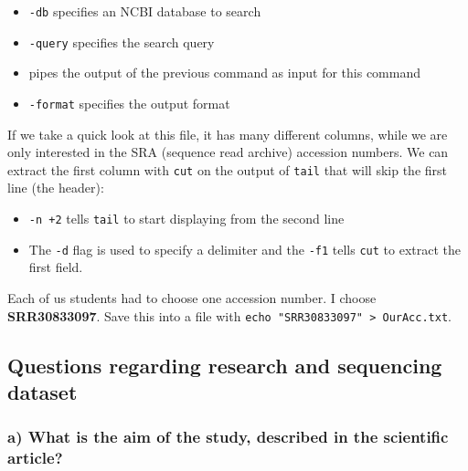 \begin{itemize}
\tightlist
\item
  \texttt{-db} specifies an NCBI database to search
\item
  \texttt{-query} specifies the search query
\item
  \texttt{\textbar{}} pipes the output of the previous command as input
  for this command
\item
  \texttt{-format} specifies the output format
\end{itemize}

If we take a quick look at this file, it has many different columns,
while we are only interested in the SRA (sequence read archive)
accession numbers. We can extract the first column with \texttt{cut} on
the output of \texttt{tail} that will skip the first line (the header):

\begin{Shaded}
\begin{Highlighting}[]
 \KeywordTok{|}   \StringTok{\textquotesingle{},\textquotesingle{}}  \OperatorTok{\textgreater{}}
\end{Highlighting}
\end{Shaded}

\begin{itemize}
\tightlist
\item
  \texttt{-n\ +2} tells \texttt{tail} to start displaying from the
  second line
\item
  The \texttt{-d} flag is used to specify a delimiter and the
  \texttt{-f1} tells \texttt{cut} to extract the first field.
\end{itemize}

Each of us students had to choose one accession number. I choose
\textbf{SRR30833097}. Save this into a file with
\texttt{echo\ "SRR30833097"\ \textgreater{}\ OurAcc.txt}.

\hypertarget{questions-regarding-research-and-sequencing-dataset}{%
\subsection{Questions regarding research and sequencing
dataset}\label{questions-regarding-research-and-sequencing-dataset}}

\hypertarget{a-what-is-the-aim-of-the-study-described-in-the-scientific-article}{%
\subsubsection{a) What is the aim of the study, described in the
scientific
article?}\label{a-what-is-the-aim-of-the-study-described-in-the-scientific-article}}


